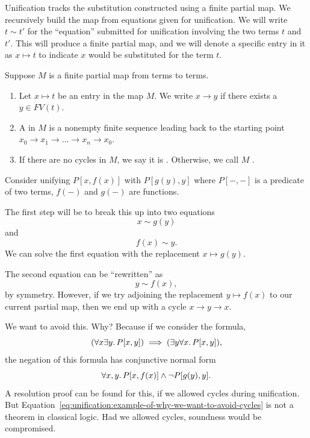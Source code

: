 \begin{node}
Unification tracks the substitution constructed using a finite partial
map. We recursively build the map from equations given for unification.
We will write $t\sim t'$ for the ``equation'' submitted for
unification involving the two terms $t$ and $t'$. This will produce a
finite partial map, and we will denote a specific entry in it as
$x\mapsto t$ to indicate $x$ would be substituted for the term $t$.
\end{node}

\begin{definition}
Suppose $M$ is a finite partial map from terms to terms.
\begin{enumerate}
\item Let $x\mapsto t$ be an entry in the map $M$. We write $x\to y$ if there exists a $y\in FV(t)$.
\item A  in $M$ is a nonempty finite sequence leading
  back to the starting point $x_{0}\to x_{1}\to\dots\to x_{n}\to x_{0}$.
\item If there are no cycles in $M$, we say it is . Otherwise,
  we call $M$ .
\end{enumerate}
\end{definition}

\begin{example}
Consider unifying $P[x,f(x)]$ with $P[g(y),y]$ where $P[-,-]$ is a
predicate of two terms, $f(-)$ and $g(-)$ are functions.

The first step will be to break this up into two equations
\begin{equation}
x\sim g(y)
\end{equation}
and
\begin{equation}
f(x)\sim y.
\end{equation}
We can solve the first equation with the replacement $x\mapsto g(y)$.

The second equation can be ``rewritten'' as
\begin{equation}
y\sim f(x),
\end{equation}
by symmetry. However, if we try adjoining the replacement $y\mapsto f(x)$
to our current partial map, then we end up with a cycle $x\to y\to x$.

We want to avoid this. Why? Because if we consider the formula,
\begin{equation}\label{eq:unification:example-of-why-we-want-to-avoid-cycles}
(\forall x\exists y\ldotp P[x,y])\implies(\exists y\forall x\ldotp P[x,y]),
\end{equation}
the negation of this formula has conjunctive normal form
\begin{equation}
\forall x,y\ldotp P[x,f(x)]\land\neg P[g(y),y].
\end{equation}
A resolution proof can be found for this, if we allowed cycles during
unification. But Equation~\eqref{eq:unification:example-of-why-we-want-to-avoid-cycles}
is not a theorem in classical logic. Had we allowed cycles, soundness
would be compromised. 
\end{example}

